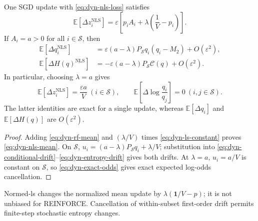 \begin{lemma}
\label{lem:dyn-normed-ls}
One SGD update with \eqref{eq:dyn-nls-loss} satisfies
\begin{equation}
 \mathbb E[\Delta z_i^{\mathrm{NLS}}]
 =\varepsilon\left[p_iA_i+\lambda\left(\frac1V-p_i\right)\right].
 \label{eq:dyn-nls-mean}
\end{equation}
If $A_i=a>0$ for all $i\in\mathcal S$, then
\begin{align}
 \mathbb E[\Delta q_i^{\mathrm{NLS}}]
 &=\varepsilon(a-\lambda)P_{\mathcal S}q_i(q_i-M_2)
       +O(\varepsilon^2),
 \label{eq:dyn-nls-q}\\
 \mathbb E[\Delta H(q)^{\mathrm{NLS}}]
 &=-\varepsilon(a-\lambda)P_{\mathcal S}\mathcal C(q)
       +O(\varepsilon^2).
 \label{eq:dyn-nls-h}
\end{align}
In particular, choosing $\lambda=a$ gives
\begin{equation}
 \mathbb E[\Delta z_i^{\mathrm{NLS}}]=\frac{\varepsilon a}{V}
 \ (i\in\mathcal S),\qquad
 \mathbb E\left[\Delta\log\frac{q_i}{q_j}\right]=0
 \ (i,j\in\mathcal S).
 \label{eq:dyn-nls-cancellation}
\end{equation}
The latter identities are exact for a single update, whereas
$\mathbb E[\Delta q_i]$ and $\mathbb E[\Delta H(q)]$ are
$O(\varepsilon^2)$.
\end{lemma}

\begin{proof}
Adding \eqref{eq:dyn-rf-mean} and $(\lambda/V)$ times
\eqref{eq:dyn-ls-constant} proves \eqref{eq:dyn-nls-mean}. On $\mathcal S$,
$u_i=(a-\lambda)P_{\mathcal S}q_i+\lambda/V$; substitution into
\eqref{eq:dyn-conditional-drift}--\ref{eq:dyn-entropy-drift} gives both
drifts. At $\lambda=a$, $u_i=a/V$ is constant on $\mathcal S$, so
\eqref{eq:dyn-exact-odds} gives exact expected log-odds cancellation.

\end{proof}

Normed-ls changes the normalized mean update by
$\lambda(\mathbf 1/V-p)$; it is not unbiased for REINFORCE.
Cancellation of within-subset first-order drift permits finite-step
stochastic entropy changes.

